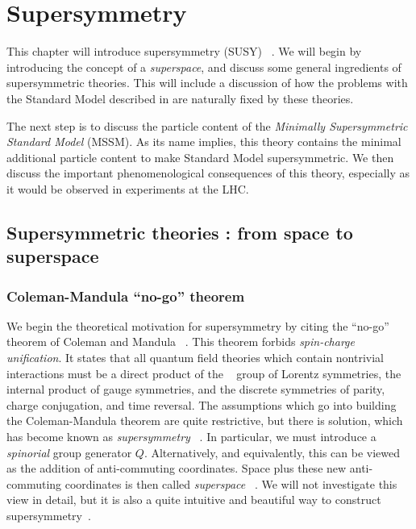 

\chapter[Supersymmetry][Top of Page Title]{Supersymmetry}\label{ch:susy}

This chapter will introduce supersymmetry (SUSY) ~\cite{Miyazawa:1966mfa, Gervais:1971xj, Gervais:1971ji, Golfand:1971iw, Neveu:1971rx, Neveu:1971iv, Volkov:1973ix,  Wess:1973kz, Salam:1974ig, Ferrara:1974ac, Wess:1974tw, susyPrimer,Lykken:1996xt, archilSUSYLectures}.
We will begin by introducing the concept of a \textit{superspace}, and discuss some general ingredients of supersymmetric theories.
This will include a discussion of how the problems with the Standard Model described in  are naturally fixed by these theories.

The next step is to discuss the particle content of the \textit{Minimally Supersymmetric Standard Model} (MSSM).
As its name implies, this theory contains the minimal additional particle content to make Standard Model supersymmetric.
We then discuss the important phenomenological consequences of this theory, especially as it would be observed in experiments at the LHC.

\section{Supersymmetric theories : from space to superspace}

\subsection{Coleman-Mandula ``no-go'' theorem}

We begin the theoretical motivation for supersymmetry by citing the ``no-go'' theorem of Coleman and Mandula ~\cite{Coleman:1967ad}.
This theorem forbids \textit{spin-charge unification}.
It states that all quantum field theories which contain nontrivial interactions must be a direct product of the \Poincare~ group of Lorentz symmetries, the internal product of gauge symmetries, and the discrete symmetries of parity, charge conjugation, and time reversal.
The assumptions which go into building the Coleman-Mandula theorem are quite restrictive, but there is solution, which has become known as \textit{supersymmetry} ~\cite{Golfand:1971iw, Haag:1974qh}.
In particular, we must introduce a \textit{spinorial} group generator $Q$.
Alternatively, and equivalently, this can be viewed as the addition of anti-commuting coordinates.
Space plus these new anti-commuting coordinates is then called \textit{superspace} ~\cite{Salam:1974jj}.
We will not investigate this view in detail, but it is also a quite intuitive and beautiful way to construct supersymmetry~\cite{susyPrimer}.

